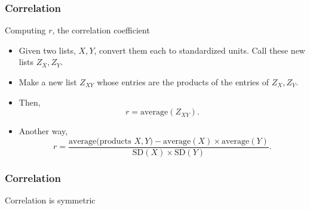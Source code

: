 \documentclass[handout]{beamer}
\begin{document}

   \begin{frame} \frametitle{Correlation}

   \begin{block}
   {Computing $r$, the correlation coefficient}

   \begin{itemize}
   \item Given two lists, $X, Y$, convert them
   each to standardized units. Call these new lists $Z_X, Z_Y$.

   \item Make a new list $Z_{XY}$ whose entries are the products
   of the entries of $Z_X, Z_Y$.
   \item Then,
   $$
   r = \text{average}(Z_{XY}).
   $$
   \item Another way,
   $$
   r = \frac{\text{average(products $X, Y$)} - \text{average}(X) \times \text{average}(Y)}{\text{SD}(X) \times \text{SD}(Y)}.
   $$
   \end{itemize}
   \end{block}
   \end{frame}



   \begin{frame}
   \frametitle{Correlation}
   \begin{center}
   \end{center}
   Correlation is symmetric
   \end{frame}

\end{document}

